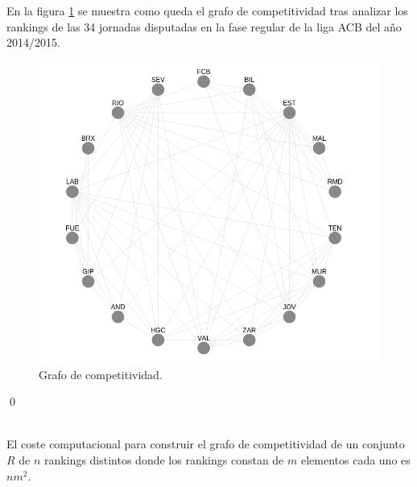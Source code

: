\begin{ejem} En la figura \ref{fig:gcomp} se muestra como queda el grafo de competitividad tras analizar los rankings de las 34 jornadas disputadas en la fase regular de la liga ACB del año 2014/2015.
\end{ejem}	
	\begin{figure}[H]
		\centering
		\includegraphics[scale=0.6]{images/Grafo_competitividad.png}
		\caption{Grafo de competitividad.} \label{fig:gcomp}
	\end{figure}
	
\qed

\ \\

El coste computacional para construir el grafo de competitividad de un conjunto $R$ de $n$ rankings distintos donde los rankings constan de $m$ elementos cada uno es $nm^{2}$.